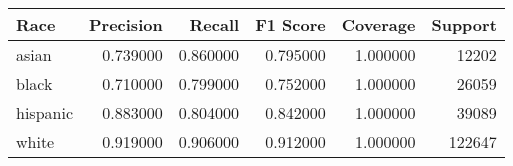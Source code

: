 \begin{tabular}{lrrrrr}
\toprule
Race & Precision & Recall & F1 Score & Coverage & Support \\
\midrule
asian & 0.739000 & 0.860000 & 0.795000 & 1.000000 & 12202 \\
black & 0.710000 & 0.799000 & 0.752000 & 1.000000 & 26059 \\
hispanic & 0.883000 & 0.804000 & 0.842000 & 1.000000 & 39089 \\
white & 0.919000 & 0.906000 & 0.912000 & 1.000000 & 122647 \\
\bottomrule
\end{tabular}
